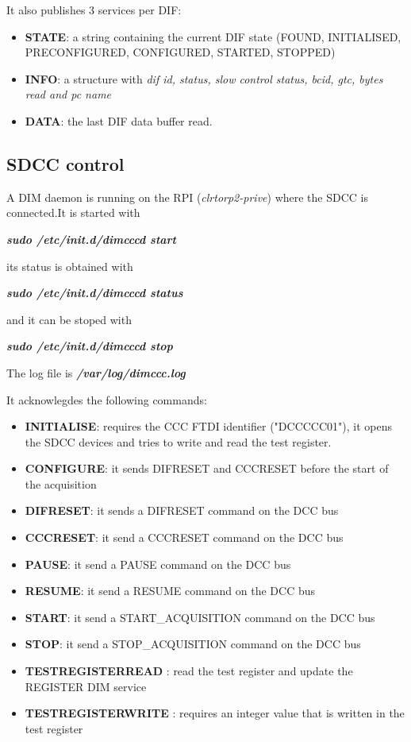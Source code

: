 \documentclass[english]{article}
\begin{document}
It also publishes 3 services per DIF:
\begin{itemize}
\item {\bf STATE}: a string containing the current DIF state (FOUND, INITIALISED, PRECONFIGURED, CONFIGURED, STARTED, STOPPED)

\item {\bf INFO}: a structure with {\sl dif id, status, slow control status, bcid, gtc,  bytes read and pc name}

\item {\bf DATA}: the last DIF data buffer read. 
\end{itemize}


\subsection{SDCC control}

A DIM daemon is running on the RPI ({\sl clrtorp2-prive}) where the SDCC is connected.It is started with

{\sl \bf sudo /etc/init.d/dimcccd start }

its status is obtained with 

{\sl \bf sudo /etc/init.d/dimcccd status }

and it can be stoped with

{\sl \bf sudo /etc/init.d/dimcccd stop }
 
 The log file is {\sl \bf /var/log/dimccc.log }
 
 It acknowlegdes the following commands:
 \begin{itemize}
\item {\bf INITIALISE}: requires the CCC FTDI identifier ("DCCCCC01"), it opens the SDCC devices and tries to write and read the test register. 
\item {\bf CONFIGURE}: it sends DIFRESET and CCCRESET before the start of the acquisition
\item {\bf DIFRESET}: it sends a DIFRESET command on the DCC bus
\item {\bf CCCRESET}: it send a CCCRESET command on the DCC bus
\item {\bf PAUSE}: it send a PAUSE command on the DCC bus
\item {\bf RESUME}: it send a RESUME command on the DCC bus
\item {\bf START}: it send a START\_ACQUISITION command on the DCC bus
\item {\bf STOP}: it send a STOP\_ACQUISITION command on the DCC bus
\item { \bf TESTREGISTERREAD }: read the test register and update the REGISTER DIM service
\item { \bf TESTREGISTERWRITE }: requires an integer value that is written in the test register
\end{itemize}
\end{document}
